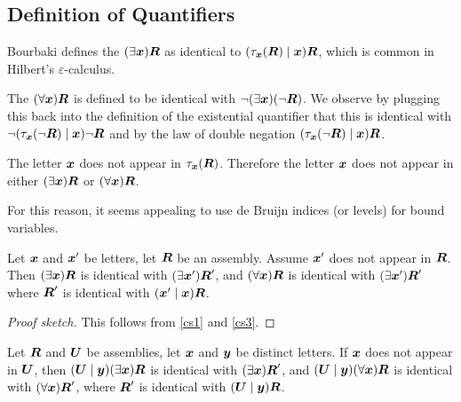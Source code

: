 \subsection{Definition of Quantifiers}

\begin{definition}
Bourbaki defines the  $(\exists\boldsymbol{x})\boldsymbol{R}$
as identical to $(\tau_{\boldsymbol{x}}(\boldsymbol{R})\mid\boldsymbol{x})\boldsymbol{R}$,
which is common in Hilbert's $\varepsilon$-calculus.

The 
$(\forall\boldsymbol{x})\boldsymbol{R}$ is defined to be identical
with $\neg(\exists\boldsymbol{x})(\neg\boldsymbol{R})$. We observe
by plugging this back into the definition of the existential quantifier
that this is identical with $\neg(\tau_{\boldsymbol{x}}(\neg\boldsymbol{R})\mid\boldsymbol{x})\neg\boldsymbol{R}$
and by the law of double negation $(\tau_{\boldsymbol{x}}(\neg\boldsymbol{R})\mid\boldsymbol{x})\boldsymbol{R}$.
\end{definition}

\begin{proposition}
The letter $\boldsymbol{x}$ does not appear in $\tau_{\boldsymbol{x}}(\boldsymbol{R})$.
Therefore the letter $\boldsymbol{x}$ does not appear in either
$(\exists\boldsymbol{x})\boldsymbol{R}$ or $(\forall\boldsymbol{x})\boldsymbol{R}$.

For this reason, it seems appealing to use de Bruijn indices (or levels) for bound variables.
\end{proposition}

\begin{cs}\label{cs8}
Let $\boldsymbol{x}$ and $\boldsymbol{x}'$ be letters, let
$\boldsymbol{R}$ be an assembly. Assume $\boldsymbol{x}'$ does not
appear in $\boldsymbol{R}$. Then
$(\exists\boldsymbol{x})\boldsymbol{R}$ is identical with
$(\exists\boldsymbol{x}')\boldsymbol{R}'$, and
$(\forall\boldsymbol{x})\boldsymbol{R}$ is identical with
$(\exists\boldsymbol{x}')\boldsymbol{R}'$ where $\boldsymbol{R}'$
is identical with $(\boldsymbol{x}'\mid\boldsymbol{x})\boldsymbol{R}$.
\end{cs}

\begin{proof}[Proof sketch]
This follows from \ref{cs1} and \ref{cs3}.
\end{proof}

\begin{cs}\label{cs9}
Let $\boldsymbol{R}$ and $\boldsymbol{U}$ be assemblies, let
$\boldsymbol{x}$ and $\boldsymbol{y}$ be distinct letters. If
$\boldsymbol{x}$ does not appear in $\boldsymbol{U}$, then
$(\boldsymbol{U}\mid\boldsymbol{y})(\exists\boldsymbol{x})\boldsymbol{R}$
is identical with $(\exists\boldsymbol{x})\boldsymbol{R}'$, and 
$(\boldsymbol{U}\mid\boldsymbol{y})(\forall\boldsymbol{x})\boldsymbol{R}$
is identical with $(\forall\boldsymbol{x})\boldsymbol{R}'$, where
$\boldsymbol{R}'$ is identical with $(\boldsymbol{U}\mid\boldsymbol{y})\boldsymbol{R}$.
\end{cs}

